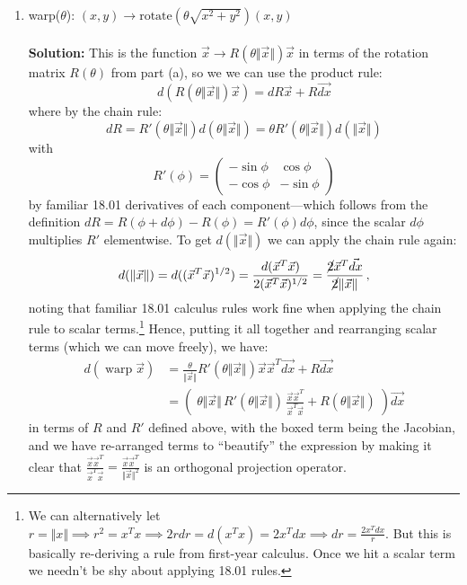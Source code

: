 \documentclass{article}
\begin{document}
\begin{enumerate}[label=(\alph*)]
\item warp($\theta$):
$ (x, y) \rightarrow  \mbox{rotate}(\theta \sqrt{x^2+y^2})(x, y)$
\\
\\
\textbf{Solution:} This is the function $\vec{x} \to R(\theta\Vert \vec{x} \Vert) \vec{x}$ in terms of the rotation matrix $R(\theta)$ from part (a), so we we can use the product rule:
$$
d\left( R(\theta\Vert \vec{x} \Vert) \vec{x} \right) = dR \vec{x} + R \vec{dx}
$$
where by the chain rule:
$$
dR = R'(\theta\Vert \vec{x} \Vert) d(\theta\Vert \vec{x} \Vert) = \theta R'(\theta\Vert \vec{x} \Vert) d(\Vert \vec{x} \Vert) 
$$
with
$$
R'(\phi) = \begin{pmatrix} -\sin \phi & \cos \phi \\ -\cos \phi & -\sin\phi \end{pmatrix}
$$
by familiar 18.01 derivatives of each component---which follows from the definition $dR = R(\phi + d\phi) - R(\phi) = R'(\phi) d\phi$, since the scalar $d\phi$ multiplies $R'$ elementwise.  To get $d(\Vert \vec{x} \Vert)$ we can apply the chain rule again:
$$
d(\Vert \vec{x} \Vert) = d((\vec{x}^T \vec{x})^{1/2}) = \frac{d(\vec{x}^T \vec{x})}{2(\vec{x}^T \vec{x})^{1/2}} = \frac{\cancel{2}\vec{x}^T \vec{dx}}{\cancel{2}\Vert \vec{x} \Vert} \, ,
$$
noting that familiar 18.01 calculus rules work fine when applying the chain rule to scalar terms.\footnote{We can alternatively let $r = \Vert x \Vert \implies r^2 = x^T x \implies 2r dr = d(x^T x) = 2x^T dx \implies dr = \frac{2x^T dx}{r}$.  But this is basically re-deriving a rule from first-year calculus.  Once we hit a scalar term we needn't be shy about applying 18.01 rules.}  Hence, putting it all together and rearranging scalar terms (which we can move freely), we have:
\begin{align*}
d(\operatorname{warp} \vec{x}) &= 
\frac{\theta}{\Vert \vec{x} \Vert} R'(\theta\Vert \vec{x}\Vert) \vec{x}  \vec{x}^T \vec{dx}  + R \vec{dx} \\
&= \left( \; \boxed{\theta \Vert \vec{x}\Vert \, R'(\theta\Vert \vec{x}\Vert) \, \frac{\vec{x} \vec{x}^T}{\vec{x}^T \vec{x}} + R(\theta\Vert \vec{x}\Vert)} \; \right) \vec{dx}
\end{align*}
in terms of $R$ and $R'$ defined above, with the boxed term being the Jacobian, and we have re-arranged terms to ``beautify'' the expression by making it clear that $\frac{\vec{x} \vec{x}^T}{\vec{x}^T \vec{x}} = \frac{\vec{x} \vec{x}^T}{\Vert \vec{x} \Vert^2}$ is an orthogonal projection operator.

\end{enumerate}
\end{document}
